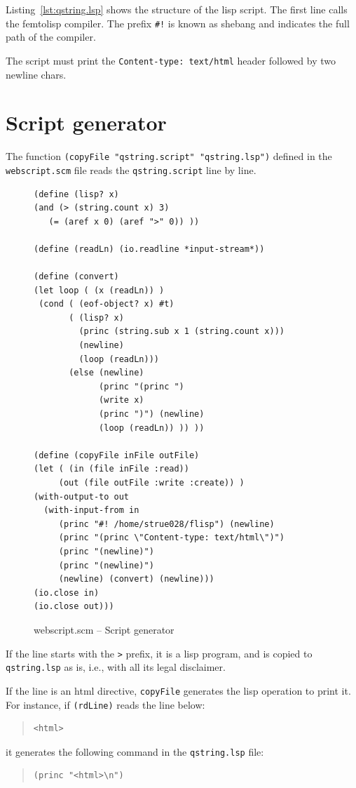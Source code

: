 \documentclass[a4paper,12pt]{book}
\begin{document}
Listing~\ref{lst:qstring.lsp} shows
the structure of the lisp script.
The first line calls the femtolisp
compiler. The prefix \verb|#!|
is known as shebang and indicates
the full path of the compiler.

The script must print the
\verb|Content-type: text/html| header
followed by two newline chars.

\section{Script generator}

The function \verb|(copyFile "qstring.script" "qstring.lsp")|
defined in the \verb|webscript.scm| file reads the
\verb|qstring.script| line by line.

\begin{figure}[!h]
\begin{verbatim}
(define (lisp? x)
(and (> (string.count x) 3)
   (= (aref x 0) (aref ">" 0)) ))

(define (readLn) (io.readline *input-stream*))

(define (convert)
(let loop ( (x (readLn)) )
 (cond ( (eof-object? x) #t)
       ( (lisp? x)
         (princ (string.sub x 1 (string.count x))) 
         (newline)
         (loop (readLn))) 
       (else (newline)
             (princ "(princ ")
             (write x)
             (princ ")") (newline)
             (loop (readLn)) )) ))

(define (copyFile inFile outFile)
(let ( (in (file inFile :read))
     (out (file outFile :write :create)) )
(with-output-to out
  (with-input-from in   
     (princ "#! /home/strue028/flisp") (newline)
     (princ "(princ \"Content-type: text/html\")")
     (princ "(newline)")
     (princ "(newline)")
     (newline) (convert) (newline)))
(io.close in)
(io.close out)))
\end{verbatim}
\caption{webscript.scm -- Script generator}
\label{lst:webscript.scm}
\end{figure}



If the line
starts with the \verb|>| prefix, it is a lisp
program, and is copied to \verb|qstring.lsp| as is,
i.e., with all its legal disclaimer.

If the line is an html directive, \verb|copyFile|
generates the lisp operation to print it. For instance,
if \verb|(rdLine)| reads the line below:
\begin{quote}
\begin{verbatim}
<html>
\end{verbatim}
\end{quote}
it generates the following command in the
\verb|qstring.lsp| file:
\begin{quote}
\begin{verbatim}
(princ "<html>\n")
\end{verbatim}
\end{quote}
\end{document}
